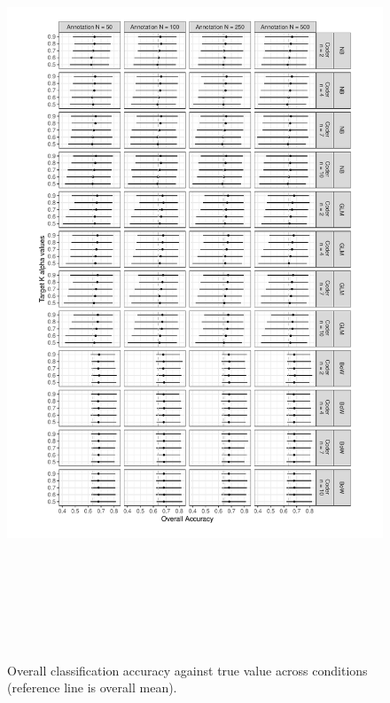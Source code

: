 \documentclass[man, floatsintext, 12pt, a4paper, noextraspace]{apa6}
\begin{document}
\begin{figure}[!htbp]
         \captionsetup[figure]{labelfont=bf,textfont=normalfont,singlelinecheck=on}
         \centering
         \includegraphics[trim={1.2cm 0.2cm 0.2cm 0.2cm}, clip, width=\columnwidth, height=23cm]{Results/overall_accuracy.pdf} 
         \captionsetup{format=hang}
         \caption{Overall classification accuracy against true value across conditions (reference line is overall mean).} 
         \label{fig:Figure1}
\end{figure}    
\end{document}
